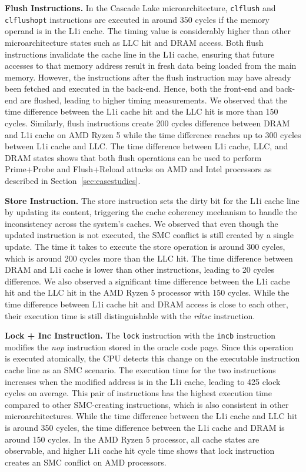 \noindent\textbf{Flush Instructions.} In the Cascade Lake microarchitecture, \texttt{clflush} and \texttt{clflushopt} instructions are executed in around 350 cycles if the memory operand is in the L1i cache. The timing value is considerably higher than other microarchitecture states such as LLC hit and DRAM access. Both flush instructions invalidate the cache line in the L1i cache, ensuring that future accesses to that memory address result in fresh data being loaded from the main memory. However, the instructions after the flush instruction may have already been fetched and executed in the back-end. Hence, both the front-end and back-end are flushed, leading to higher timing measurements. We observed that the time difference between the L1i cache hit and the LLC hit is more than 150 cycles. 
Similarly, flush instructions create 200 cycles difference between DRAM and L1i cache on AMD Ryzen 5 while the time difference reaches up to 300 cycles between L1i cache and LLC. The time difference between L1i cache, LLC, and DRAM states shows that both flush operations can be used to perform Prime+Probe and Flush+Reload attacks on AMD and Intel processors as described in Section~\ref{sec:casestudies}.

\noindent\textbf{Store Instruction.} The store instruction sets the dirty bit for the L1i cache line by updating its content, triggering the cache coherency mechanism to handle the inconsistency across the system's caches. We observed that even though the updated instruction is not executed, the SMC conflict is still created by a single update. The time it takes to execute the store operation is around 300 cycles, which is around 200 cycles more than the LLC hit. The time difference between DRAM and L1i cache is lower than other instructions, leading to 20 cycles difference. 
We also observed a significant time difference between the L1i cache hit and the LLC hit in the AMD Ryzen 5 processor with 150 cycles. While the time difference between L1i cache hit and DRAM access is close to each other, their execution time is still distinguishable with the \textit{rdtsc} instruction.

\noindent\textbf{Lock + Inc Instruction.} The \texttt{lock} instruction with the \texttt{incb} instruction modifies the \textit{nop} instruction stored in the oracle code page. Since this operation is executed atomically, the CPU detects this change on the executable instruction cache line as an SMC scenario. The execution time for the two instructions increases when the modified address is in the L1i cache, leading to 425 clock cycles on average. This pair of instructions has the highest execution time compared to other SMC-creating instructions, which is also consistent in other microarchitectures. While the time difference between the L1i cache and LLC hit is around 350 cycles, the time difference between the L1i cache and DRAM is around 150 cycles. 
In the AMD Ryzen 5 processor, all cache states are observable, and higher L1i cache hit cycle time shows that lock instruction creates an SMC conflict on AMD processors.

